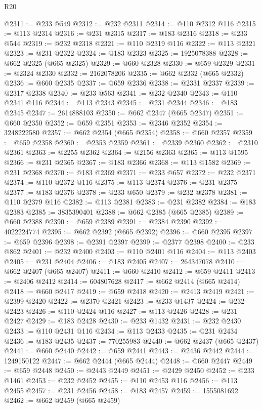 \begin{lexlean}{R20}
\begin{coremodule}
@2311 := @233 @549
@2312 := @232 @2311
@2314 := @110 @2312 @116
@2315 := @113 @2314
@2316 := @231 @2315
@2317 := @183 @2316
@2318 := @233 @544
@2319 := @232 @2318
@2321 := @110 @2319 @116
@2322 := @113 @2321
@2323 := @231 @2322
@2324 := @183 @2323
@2325 := 1925078388
@2328 := @662 @2325 (@665 @2325)
@2329 := @660 @2328
@2330 := @659 @2329
@2331 := @2324 @2330
@2332 := 2162078206
@2335 := @662 @2332 (@665 @2332)
@2336 := @660 @2335
@2337 := @659 @2336
@2338 := @2331 @2337
@2339 := @2317 @2338
@2340 := @233 @563
@2341 := @232 @2340
@2343 := @110 @2341 @116
@2344 := @113 @2343
@2345 := @231 @2344
@2346 := @183 @2345
@2347 := 2614888103
@2350 := @662 @2347 (@665 @2347)
@2351 := @660 @2350
@2352 := @659 @2351
@2353 := @2346 @2352
@2354 := 3248222580
@2357 := @662 @2354 (@665 @2354)
@2358 := @660 @2357
@2359 := @659 @2358
@2360 := @2353 @2359
@2361 := @2339 @2360
@2362 := @2310 @2361
@2363 := @2255 @2362
@2364 := @2156 @2363
@2365 := @113 @1595
@2366 := @231 @2365
@2367 := @183 @2366
@2368 := @113 @1582
@2369 := @231 @2368
@2370 := @183 @2369
@2371 := @233 @657
@2372 := @232 @2371
@2374 := @110 @2372 @116
@2375 := @113 @2374
@2376 := @231 @2375
@2377 := @183 @2376
@2378 := @233 @650
@2379 := @232 @2378
@2381 := @110 @2379 @116
@2382 := @113 @2381
@2383 := @231 @2382
@2384 := @183 @2383
@2385 := 3835390401
@2388 := @662 @2385 (@665 @2385)
@2389 := @660 @2388
@2390 := @659 @2389
@2391 := @2384 @2390
@2392 := 4022224774
@2395 := @662 @2392 (@665 @2392)
@2396 := @660 @2395
@2397 := @659 @2396
@2398 := @2391 @2397
@2399 := @2377 @2398
@2400 := @233 @862
@2401 := @232 @2400
@2403 := @110 @2401 @116
@2404 := @113 @2403
@2405 := @231 @2404
@2406 := @183 @2405
@2407 := 264347078
@2410 := @662 @2407 (@665 @2407)
@2411 := @660 @2410
@2412 := @659 @2411
@2413 := @2406 @2412
@2414 := 604807628
@2417 := @662 @2414 (@665 @2414)
@2418 := @660 @2417
@2419 := @659 @2418
@2420 := @2413 @2419
@2421 := @2399 @2420
@2422 := @2370 @2421
@2423 := @233 @1437
@2424 := @232 @2423
@2426 := @110 @2424 @116
@2427 := @113 @2426
@2428 := @231 @2427
@2429 := @183 @2428
@2430 := @233 @1432
@2431 := @232 @2430
@2433 := @110 @2431 @116
@2434 := @113 @2433
@2435 := @231 @2434
@2436 := @183 @2435
@2437 := 770255983
@2440 := @662 @2437 (@665 @2437)
@2441 := @660 @2440
@2442 := @659 @2441
@2443 := @2436 @2442
@2444 := 1249150122
@2447 := @662 @2444 (@665 @2444)
@2448 := @660 @2447
@2449 := @659 @2448
@2450 := @2443 @2449
@2451 := @2429 @2450
@2452 := @233 @1461
@2453 := @232 @2452
@2455 := @110 @2453 @116
@2456 := @113 @2455
@2457 := @231 @2456
@2458 := @183 @2457
@2459 := 1555081692
@2462 := @662 @2459 (@665 @2459)

\end{coremodule}
\end{lexlean}
